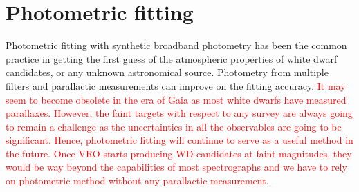 \documentclass[fleqn,usenatbib]{rasti}
\begin{document}
\section{Photometric fitting}
Photometric fitting with synthetic broadband photometry has been the common
practice in getting the first guess of the atmospheric properties of white
dwarf candidates, or any unknown astronomical source. Photometry from multiple
filters and parallactic measurements can improve on the fitting accuracy.
\textcolor{red}{It may seem to become obsolete in the era of Gaia as most white
dwarfs have measured parallaxes. However, the faint targets with respect to any
survey are always going to remain a challenge as the uncertainties in all the
observables are going to be significant. Hence, photometric fitting will
continue to serve as a useful method in the future. Once VRO starts producing
WD candidates at faint magnitudes, they would be way beyond the capabilities
of most spectrographs and we have to rely on photometric method without
any parallactic measurement.}
\end{document}
